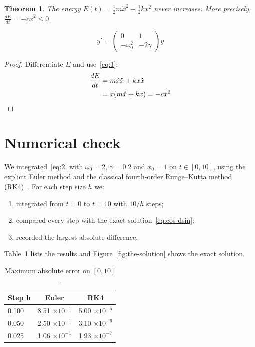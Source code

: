 \documentclass[11pt,a4paper]{article}
\newtheorem{theorem}{Theorem}
\begin{document}
\begin{theorem}
  The energy $E(t)=\frac{1}{2}m\dot{x}^{2}+\frac{1}{2}kx^{2}$ never increases. More precisely, $\frac{dE}{dt}=-c\dot{x}^{2}\leq0$.
\end{theorem}

\begin{equation}
  y'=\begin{pmatrix}
0 & 1 \\
-\omega_{0}^{2} & -2\gamma
\end{pmatrix}y
\end{equation}

\begin{proof}
  Differentiate $E$ and use~\eqref{eq:1}:
\begin{align*}
  \frac{dE}{dt} &=m\dot{x}\ddot{x}+kx\dot{x} \\
   &=\dot{x}(m\ddot{x}+kx)=-c\dot{x}^{2} \qedhere
\end{align*}
\end{proof}

\section{Numerical check}

We integrated~\eqref{eq:2} with $\omega_{0}=2$, $\gamma=0.2$ and $x_{0}=1$ on $t\in[0,10]$, using the explicit Euler method and the classical fourth-order Runge--Kutta method (RK4)~\cite{ref2}. For each step size $h$ we:

\begin{enumerate}
  \item integrated from $t=0$ to $t=10$ with $10/h$ steps;
  \item compared every step with the exact solution~\eqref{eq:cos-dsin};
  \item recorded the largest absolute difference.
\end{enumerate}

Table~\ref{tab:maximum-absolute} lists the results and Figure~\ref{fig:the-solution} shows the exact solution.

\begin{table}[htbp]
  \centering
  \caption{Maximum absolute error on $[0,10]$.}
  \label{tab:maximum-absolute}
  \begin{tabular}{lcc}
    \toprule
    \textbf{Step h} & \textbf{Euler} & \textbf{RK4} \\
    \midrule
    0.100 & 8.51 $\times10^{-1}$ & 5.00 $\times10^{-5}$ \\
    0.050 & 2.50 $\times10^{-1}$ & 3.10 $\times10^{-6}$ \\
    0.025 & 1.06 $\times10^{-1}$ & 1.93 $\times10^{-7}$ \\
    \bottomrule
  \end{tabular}
\end{table}
\end{document}
